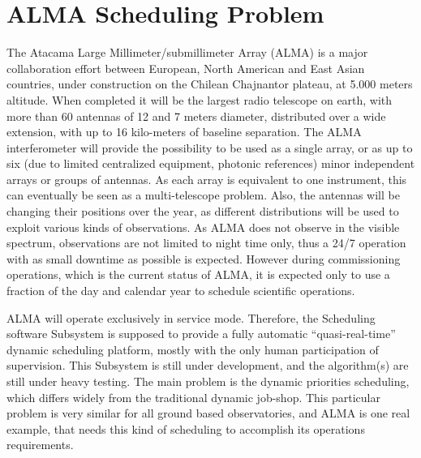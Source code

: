 \section{ALMA Scheduling Problem}
\label{sec:alma-sched-problem}
The Atacama Large Millimeter/submillimeter Array (ALMA) is a major collaboration effort between European, North American and East Asian countries, under construction on the Chilean Chajnantor plateau, at 5.000 meters altitude. When completed it will be the largest radio telescope on earth, with more than 60 antennas of 12 and 7 meters diameter, distributed over a wide extension, with up to 16 kilo-meters of baseline separation. The ALMA interferometer will provide the possibility to be used as a single array, or as up to six (due to limited centralized equipment, photonic references) minor independent arrays or groups of antennas. As each array is equivalent to one instrument, this can eventually be seen as a multi-telescope problem. Also, the antennas will be changing their positions over the year, as different distributions will be used to exploit various kinds of observations. As ALMA does not observe in the visible spectrum, observations are not limited to night time only, thus a 24/7 operation with as small downtime as possible is expected. However during commissioning operations, which is the current status of ALMA, it is expected only to use a fraction of the day and calendar year to schedule scientific operations.

ALMA will operate exclusively in service mode. Therefore, the Scheduling software Subsystem is supposed to provide a fully automatic “quasi-real-time” dynamic scheduling platform, mostly with the only human participation of supervision. This Subsystem is still under development, and the algorithm(s) are still under heavy testing. The main problem is the dynamic priorities scheduling, which differs widely from the traditional dynamic job-shop. This particular problem is very similar for all ground based observatories, and ALMA is one real example, that needs this kind of scheduling to accomplish its operations requirements.

